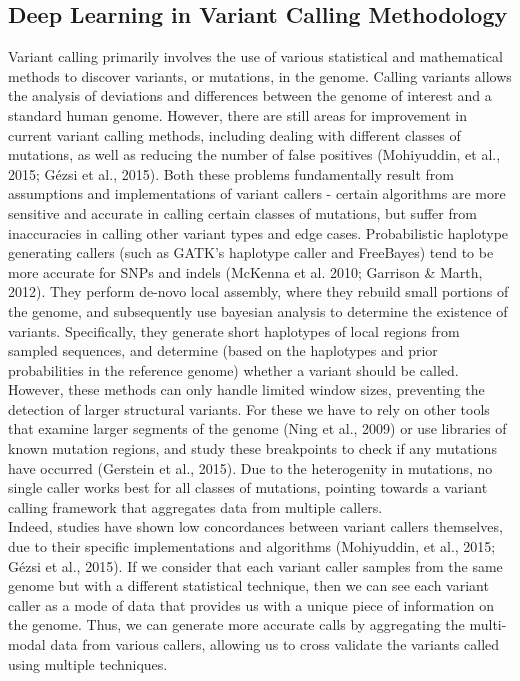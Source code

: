 \documentclass{article}
\begin{document}
\subsection{Deep Learning in Variant Calling Methodology}
Variant calling primarily involves the use of various statistical and mathematical methods to discover variants, or mutations, in the genome. Calling variants allows the analysis of deviations and differences between the genome of interest and a standard human genome. However, there are still areas for improvement in current variant calling methods, including dealing with different classes of mutations, as well as reducing the number of false positives (Mohiyuddin, et al., 2015; Gézsi et al., 2015). Both these problems fundamentally result from assumptions and implementations of variant callers - certain algorithms are more sensitive and accurate in calling certain classes of mutations, but suffer from inaccuracies in calling other variant types and edge cases. Probabilistic haplotype generating callers (such as GATK's haplotype caller and FreeBayes) tend to be more accurate for SNPs and indels (McKenna et al. 2010; Garrison \& Marth, 2012). They perform de-novo local assembly, where they rebuild small portions of the genome, and subsequently use bayesian analysis to determine the existence of variants. Specifically, they generate short haplotypes of local regions from sampled sequences, and determine (based on the haplotypes and prior probabilities in the reference genome) whether a variant should be called. However, these methods can only handle limited window sizes, preventing the detection of larger structural variants. For these we have to rely on other tools that examine larger segments of the genome (Ning et al., 2009) or use libraries of known mutation regions, and study these breakpoints to check if any mutations have occurred (Gerstein et al., 2015). Due to the heterogenity in mutations, no single caller works best for all classes of mutations, pointing towards a variant calling framework that aggregates data from multiple callers.\\

Indeed, studies have shown low concordances between variant callers themselves, due to their specific implementations and algorithms (Mohiyuddin, et al., 2015; Gézsi et al., 2015). If we consider that each variant caller samples from the same genome but with a different statistical technique, then we can see each variant caller as a mode of data that provides us with a unique piece of information on the genome. Thus, we can generate more accurate calls by aggregating the multi-modal data from various callers, allowing us to cross validate the variants called using multiple techniques.\\
\end{document}
